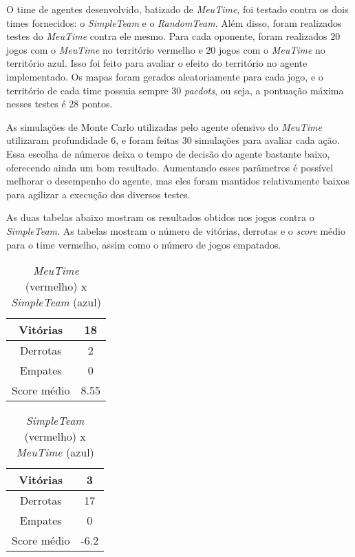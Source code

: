 \documentclass[a4paper,12pt]{article}
\begin{document}
O time de agentes desenvolvido, batizado de \textit{MeuTime}, foi testado contra os dois
times fornecidos: o \textit{SimpleTeam} e o \textit{RandomTeam}. Além disso, foram
realizados testes do \textit{MeuTime} contra ele mesmo. Para cada oponente, foram realizados
$20$ jogos com o \textit{MeuTime} no território vermelho e $20$ jogos com o \textit{MeuTime}
no território azul. Isso foi feito para avaliar o efeito do território no agente implementado.
Os mapas foram gerados aleatoriamente para cada jogo, e o território de cada time
possuia sempre $30$ \textit{pacdots}, ou seja, a pontuação máxima nesses testes é $28$ pontos.

As simulações de Monte Carlo utilizadas pelo agente ofensivo do \textit{MeuTime} utilizaram
profundidade $6$, e foram feitas $30$ simulações para avaliar cada ação. Essa escolha de números
deixa o tempo de decisão do agente bastante baixo, oferecendo ainda um bom resultado.
Aumentando esses parâmetros é
possível melhorar o desempenho do agente, mas eles foram mantidos relativamente baixos
para agilizar a execução dos diversos testes.

As duas tabelas abaixo mostram os resultados obtidos nos jogos contra o \textit{SimpleTeam}.
As tabelas mostram o número de vitórias, derrotas e o \textit{score} médio para o time vermelho,
assim como o número de jogos empatados.

\begin{table}[htb!]
    {\centering
    \begin{tabular}{|c|c|} \hline
    Vitórias     & 18   \\ \hline
    Derrotas     & 2    \\ \hline
    Empates      & 0    \\ \hline
    Score médio  & 8.55 \\ \hline
    \end{tabular}
    \caption{\textit{MeuTime} (vermelho) x \textit{SimpleTeam} (azul)}
    }
\end{table}

\begin{table}[htb!]
    {\centering
    \begin{tabular}{|c|c|} \hline
    Vitórias     & 3    \\ \hline
    Derrotas     & 17   \\ \hline
    Empates      & 0    \\ \hline
    Score médio  & -6.2 \\ \hline
    \end{tabular}
    \caption{\textit{SimpleTeam} (vermelho) x \textit{MeuTime} (azul)}
    }
\end{table}
\end{document}
